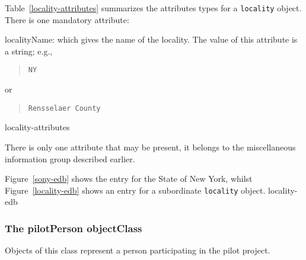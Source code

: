 Table~\ref{locality-attributes} summarizes the attributes types for
a \verb"locality" object.
There is one mandatory attribute:
\begin{describe}
\item[localityName:]
			which gives the name of the locality.
			The value of this attribute is a string; e.g.,
\begin{quote}\small\begin{verbatim}
NY
\end{verbatim}\end{quote}
or
\begin{quote}\small\begin{verbatim}
Rensselaer County
\end{verbatim}\end{quote}
\end{describe}
%
	{locality-attributes}

There is only one attribute that may be present,
it  belongs to the miscellaneous information group described earlier.

Figure~\ref{sony-edb} shows the entry for the State of New York,
whilst Figure~\ref{locality-edb} shows an entry for a subordinate
\verb"locality" object.
%
		{locality-edb}

\subsubsection	{The pilotPerson objectClass}
Objects of this class represent a person participating in the pilot project.

